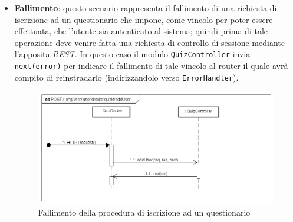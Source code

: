 \begin{itemize}
\item \textbf{Fallimento}: questo scenario rappresenta il fallimento di una richiesta di iscrizione ad un questionario che impone, come vincolo per poter essere effettuata, che l'utente sia autenticato al sistema; quindi prima di tale operazione deve venire fatta una richiesta di controllo di sessione mediante l'apposita \textit{REST}. In questo caso il modulo \texttt{QuizController} invia \texttt{next(error)} per indicare il fallimento di tale vincolo al router il quale avrà compito di reinstradarlo (indirizzandolo verso \texttt{ErrorHandler}).
\label{Fallimento della procedura di iscrizione ad un questionario}
\begin{figure}[ht]
	\centering
	\includegraphics[scale=0.40]{UML/DiagrammiDiSequenza/Back-end/POST__lang_user_userId_quiz_quizId_addUser_failure.png}
	\caption{Fallimento della procedura di iscrizione ad un questionario}
\end{figure}
\FloatBarrier
\end{itemize}

